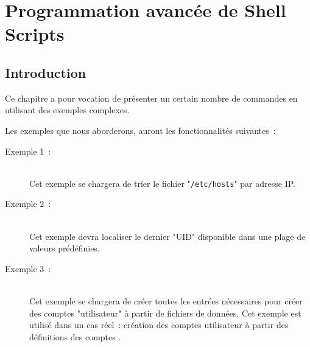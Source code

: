 %
%

\setcounter{remarque-cnt}{1}
\setcounter{example-cnt}{1}
\chapter{\label{adv-programming}Programmation avanc{\'e}e de Shell Scripts}

\section{Introduction}

Ce chapitre a pour vocation de pr{\'e}senter un certain nombre de commandes
en utilisant des exemples complexes.

Les exemples que nous aborderons, auront les fonctionnalit{\'e}s suivantes~:
\begin{description}
    \item[Exemple 1~:]\mbox{}\\
        Cet exemple se chargera de trier le fichier "{\tt /etc/hosts}"
        par adresse IP.
    \item[Exemple 2~:]\mbox{}\\
        Cet exemple devra localiser le dernier "UID" disponible
        dans une plage de valeurs pr{\'e}d{\'e}finies.
    \item[Exemple 3~:]\mbox{}\\
        Cet exemple se chargera de cr{\'e}er toutes les entr{\'e}es n{\'e}cessaires
        pour cr{\'e}er des comptes "utilisateur" {\`a} partir de fichiers de
        donn{\'e}es. Cet exemple est utilis{\'e} dans un cas r{\'e}el~: cr{\'e}ation
        des comptes utilisateur {\Unix} {\`a} partir des d{\'e}finitions
        des comptes {\OpenVMS}.
\end{description}

